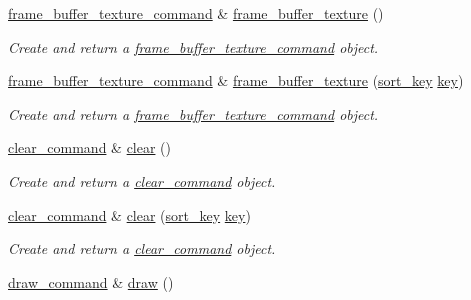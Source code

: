\begin{DoxyCompactItemize}
\mbox{\hyperlink{classmoka_1_1frame__buffer__texture__command}{frame\+\_\+buffer\+\_\+texture\+\_\+command}} \& \mbox{\hyperlink{classmoka_1_1command__list_ad9cc948acc3326122e1dae789c2179cb}{frame\+\_\+buffer\+\_\+texture}} ()
\begin{DoxyCompactList}\small\item\em Create and return a \mbox{\hyperlink{classmoka_1_1frame__buffer__texture__command}{frame\+\_\+buffer\+\_\+texture\+\_\+command}} object. \end{DoxyCompactList}\item 
\mbox{\hyperlink{classmoka_1_1frame__buffer__texture__command}{frame\+\_\+buffer\+\_\+texture\+\_\+command}} \& \mbox{\hyperlink{classmoka_1_1command__list_aa917db260af62b8f9bdd49001627f174}{frame\+\_\+buffer\+\_\+texture}} (\mbox{\hyperlink{namespacemoka_afa30a616e67b83113ebdb857555cf2bb}{sort\+\_\+key}} \mbox{\hyperlink{namespacemoka_a45a36b05a9b9eddb028d6c60305ae71d}{key}})
\begin{DoxyCompactList}\small\item\em Create and return a \mbox{\hyperlink{classmoka_1_1frame__buffer__texture__command}{frame\+\_\+buffer\+\_\+texture\+\_\+command}} object. \end{DoxyCompactList}\item 
\mbox{\hyperlink{classmoka_1_1clear__command}{clear\+\_\+command}} \& \mbox{\hyperlink{classmoka_1_1command__list_a4ca381ed2350bb80861e6c4925103a19}{clear}} ()
\begin{DoxyCompactList}\small\item\em Create and return a \mbox{\hyperlink{classmoka_1_1clear__command}{clear\+\_\+command}} object. \end{DoxyCompactList}\item 
\mbox{\hyperlink{classmoka_1_1clear__command}{clear\+\_\+command}} \& \mbox{\hyperlink{classmoka_1_1command__list_a58f8547711d66b610ba2c2086919a064}{clear}} (\mbox{\hyperlink{namespacemoka_afa30a616e67b83113ebdb857555cf2bb}{sort\+\_\+key}} \mbox{\hyperlink{namespacemoka_a45a36b05a9b9eddb028d6c60305ae71d}{key}})
\begin{DoxyCompactList}\small\item\em Create and return a \mbox{\hyperlink{classmoka_1_1clear__command}{clear\+\_\+command}} object. \end{DoxyCompactList}\item 
\mbox{\hyperlink{classmoka_1_1draw__command}{draw\+\_\+command}} \& \mbox{\hyperlink{classmoka_1_1command__list_ad48418fa5d4388898b29fcfd2610ebaf}{draw}} ()

\end{DoxyCompactItemize}
